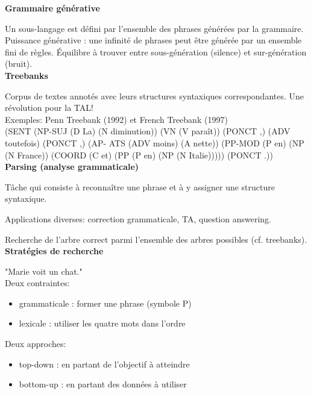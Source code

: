 \textbf{Grammaire générative}

Un sous-langage est défini par l'ensemble des phrases générées par la grammaire. Puissance générative : une infinité de phrases peut être générée par un ensemble fini de règles. Équilibre à trouver entre sous-génération (silence) et sur-génération (bruit). \\

\textbf{Treebanks}

Corpus de textes annotés avec leurs structures syntaxiques correspondantes. Une révolution pour la TAL! \\

Exemples: Penn Treebank (1992) et French Treebank (1997)\\

(SENT (NP-SUJ (D La) (N diminution)) (VN (V
paraît)) (PONCT ,) (ADV toutefois) (PONCT ,) (AP-
ATS (ADV moins) (A nette)) (PP-MOD (P en) (NP
(N France)) (COORD (C et) (PP (P en) (NP (N
Italie))))) (PONCT .)) \\

\textbf{Parsing (analyse grammaticale)}

Tâche qui consiste à reconnaître une phrase et à y assigner une structure syntaxique.

Applications diverses: correction grammaticale, TA, question answering.

Recherche de l'arbre correct parmi l'ensemble des arbres possibles (cf. treebanks).\\

\textbf{Stratégies de recherche}

"Marie voit un chat."\\

Deux contraintes:

\begin{itemize}
    \item grammaticale : former une phrase (symbole P)
    \item lexicale : utiliser les quatre mots dans l'ordre
\end{itemize}

Deux approches:

\begin{itemize}
    \item top-down : en partant de l'objectif à atteindre
    \item bottom-up : en partant des données à utiliser\\
\end{itemize}

